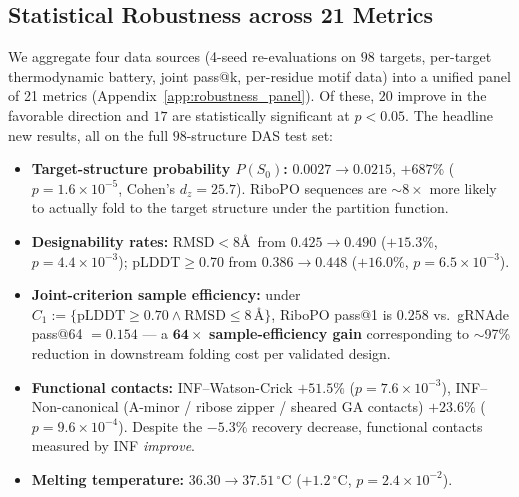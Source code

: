 \subsection{Statistical Robustness across 21 Metrics}
\label{subsec:robustness_main}

We aggregate four data sources (4-seed re-evaluations on $98$ targets, per-target thermodynamic battery, joint pass@k, per-residue motif data) into a unified panel of 21 metrics (Appendix~\ref{app:robustness_panel}). Of these, $20$ improve in the favorable direction and $17$ are statistically significant at $p < 0.05$. The headline new results, all on the full $98$-structure DAS test set:

\begin{itemize}[leftmargin=1.5em,itemsep=2pt,topsep=2pt]
\item \textbf{Target-structure probability $P(S_0)$:} $0.0027 \to 0.0215$, $+687\%$ ($p = 1.6\!\times\!10^{-5}$, Cohen's $d_z = 25.7$). RiboPO sequences are $\sim 8\!\times$ more likely to actually fold to the target structure under the partition function.
\item \textbf{Designability rates:} RMSD$<$8\AA\ from $0.425 \to 0.490$ ($+15.3\%$, $p = 4.4\!\times\!10^{-3}$); pLDDT$\geq$0.70 from $0.386 \to 0.448$ ($+16.0\%$, $p = 6.5\!\times\!10^{-3}$).
\item \textbf{Joint-criterion sample efficiency:} under $C_1 := \{\text{pLDDT}\geq 0.70 \wedge \text{RMSD}\leq 8\,\text{\AA}\}$, RiboPO pass@1 is $0.258$ vs.\ gRNAde pass@64 $= 0.154$ --- a $\boldsymbol{64\times}$ \textbf{sample-efficiency gain} corresponding to $\sim$97\% reduction in downstream folding cost per validated design.
\item \textbf{Functional contacts:} INF--Watson-Crick $+51.5\%$ ($p = 7.6\!\times\!10^{-3}$), INF--Non-canonical (A-minor / ribose zipper / sheared GA contacts) $+23.6\%$ ($p = 9.6\!\times\!10^{-4}$). Despite the $-5.3\%$ recovery decrease, functional contacts measured by INF \emph{improve}.
\item \textbf{Melting temperature:} $36.30 \to 37.51\,^\circ$C ($+1.2\,^\circ$C, $p = 2.4\!\times\!10^{-2}$).
\end{itemize}

